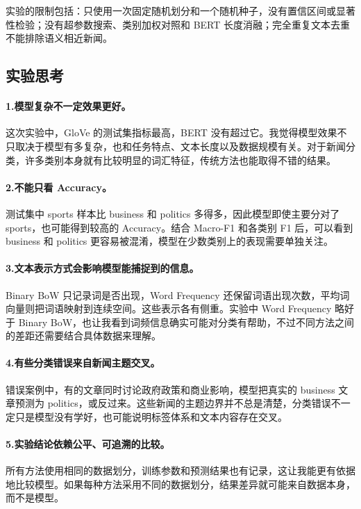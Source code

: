 \documentclass[UTF8,12pt,a4paper,fontset=fandol]{ctexart}
\begin{document}
实验的限制包括：只使用一次固定随机划分和一个随机种子，没有置信区间或显著性检验；没有超参数搜索、类别加权对照和 BERT 长度消融；完全重复文本去重不能排除语义相近新闻。

\subsection{实验思考}
\paragraph*{1.模型复杂不一定效果更好。}\mbox{}\par\nopagebreak
这次实验中，GloVe 的测试集指标最高，BERT 没有超过它。我觉得模型效果不只取决于模型有多复杂，也和任务特点、文本长度以及数据规模有关。对于新闻分类，许多类别本身就有比较明显的词汇特征，传统方法也能取得不错的结果。

\paragraph*{2.不能只看 Accuracy。}\mbox{}\par\nopagebreak
测试集中 sports 样本比 business 和 politics 多得多，因此模型即使主要分对了 sports，也可能得到较高的 Accuracy。结合 Macro-F1 和各类别 F1 后，可以看到 business 和 politics 更容易被混淆，模型在少数类别上的表现需要单独关注。

\paragraph*{3.文本表示方式会影响模型能捕捉到的信息。}\mbox{}\par\nopagebreak
Binary BoW 只记录词是否出现，Word Frequency 还保留词语出现次数，平均词向量则把词语映射到连续空间。这些表示各有侧重。实验中 Word Frequency 略好于 Binary BoW，也让我看到词频信息确实可能对分类有帮助，不过不同方法之间的差距还需要结合具体数据来理解。

\paragraph*{4.有些分类错误来自新闻主题交叉。}\mbox{}\par\nopagebreak
错误案例中，有的文章同时讨论政府政策和商业影响，模型把真实的 business 文章预测为 politics，或反过来。这些新闻的主题边界并不总是清楚，分类错误不一定只是模型没有学好，也可能说明标签体系和文本内容存在交叉。

\paragraph*{5.实验结论依赖公平、可追溯的比较。}\mbox{}\par\nopagebreak
所有方法使用相同的数据划分，训练参数和预测结果也有记录，这让我能更有依据地比较模型。如果每种方法采用不同的数据划分，结果差异就可能来自数据本身，而不是模型。
\end{document}
